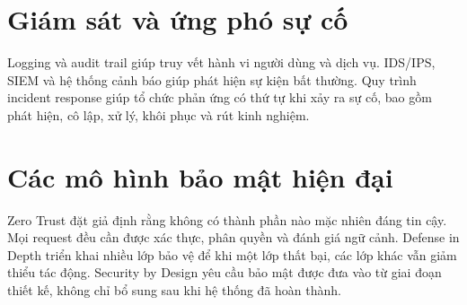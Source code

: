 \section{Giám sát và ứng phó sự cố}
Logging và audit trail giúp truy vết hành vi người dùng và dịch vụ. IDS/IPS, SIEM và hệ thống cảnh báo giúp phát hiện sự kiện bất thường. Quy trình incident response giúp tổ chức phản ứng có thứ tự khi xảy ra sự cố, bao gồm phát hiện, cô lập, xử lý, khôi phục và rút kinh nghiệm.

\section{Các mô hình bảo mật hiện đại}
Zero Trust đặt giả định rằng không có thành phần nào mặc nhiên đáng tin cậy. Mọi request đều cần được xác thực, phân quyền và đánh giá ngữ cảnh. Defense in Depth triển khai nhiều lớp bảo vệ để khi một lớp thất bại, các lớp khác vẫn giảm thiểu tác động. Security by Design yêu cầu bảo mật được đưa vào từ giai đoạn thiết kế, không chỉ bổ sung sau khi hệ thống đã hoàn thành.
